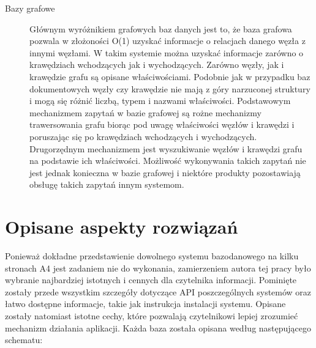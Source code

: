 \begin{description}
 \item[Bazy grafowe]
 Głównym wyróżnikiem grafowych baz danych jest to, że baza grafowa pozwala w złożoności O(1) uzyskać informacje o relacjach danego węzła z innymi węzłami.
 W takim systemie można uzyskać informacje zarówno o krawędziach wchodzących jak i wychodzących.
 Zarówno węzły, jak i krawędzie grafu są opisane właściwościami.
 Podobnie jak w przypadku baz dokumentowych węzły czy krawędzie nie mają z góry narzuconej struktury i mogą się różnić liczbą, typem i nazwami właściwości.
 Podstawowym mechanizmem zapytań w bazie grafowej są rożne mechanizmy trawersowania grafu biorąc pod uwagę właściwości węzłów i krawędzi i poruszając się po krawędziach wchodzących i wychodzących.
 Drugorzędnym mechanizmem jest wyszukiwanie węzłów i krawędzi grafu na podstawie ich właściwości.
 Możliwość wykonywania takich zapytań nie jest jednak konieczna w bazie grafowej i niektóre produkty pozostawiają obsługę takich zapytań innym systemom. 

\end{description}

\section{Opisane aspekty rozwiązań}

Ponieważ dokładne przedstawienie dowolnego systemu bazodanowego na kilku stronach A4 jest zadaniem nie do wykonania, zamierzeniem autora tej pracy było wybranie najbardziej istotnych i cennych dla czytelnika informacji.
Pominięte zostały przede wszystkim szczegóły dotyczące API poszczególnych systemów oraz łatwo dostępne informacje, takie jak instrukcja instalacji systemu.
Opisane zostały natomiast istotne cechy, które pozwalają czytelnikowi lepiej zrozumieć mechanizm działania aplikacji.
Każda baza została opisana według następującego schematu:

